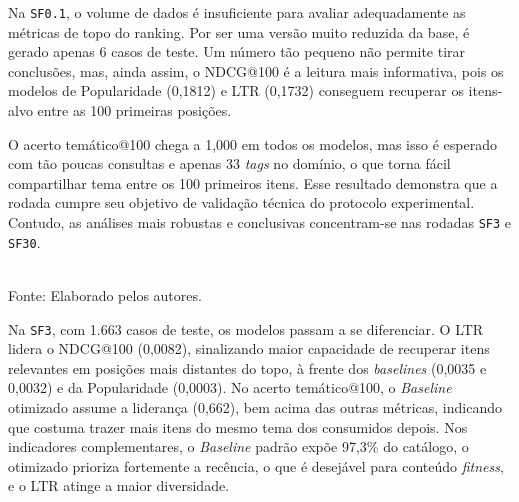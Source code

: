 \documentclass[a4paper,12pt]{article}
\begin{document}
{Na \texttt{SF0.1}, o volume de dados é insuficiente para avaliar adequadamente as métricas de topo do ranking. Por ser uma versão muito reduzida da base, é gerado apenas 6 casos de teste. Um número tão pequeno não permite tirar conclusões, mas, ainda assim, o NDCG@100 é a leitura mais informativa, pois os modelos de Popularidade (0,1812) e LTR (0,1732) conseguem recuperar os itens-alvo entre as 100 primeiras posições. 

O acerto temático@100 chega a 1,000 em todos os modelos, mas isso é esperado com tão poucas consultas e apenas 33 \textit{tags} no domínio, o que torna fácil compartilhar tema entre os 100 primeiros itens. Esse resultado demonstra que a rodada cumpre seu objetivo de validação técnica do protocolo experimental. Contudo, as análises mais robustas e conclusivas concentram-se nas rodadas \texttt{SF3} e \texttt{SF30}.

\begin{table}[H]
\centering
\caption{Resultados da rodada intermediária na versão \texttt{SF3}}
\label{tab:resultados_sf3}
\scriptsize
{}
\small \\ Fonte: Elaborado pelos autores.
\end{table}

Na \texttt{SF3}, com 1.663 casos de teste, os modelos passam a se diferenciar. O LTR lidera o NDCG@100 (0,0082), sinalizando maior capacidade de recuperar itens relevantes em posições mais distantes do topo, à frente dos \textit{baselines} (0,0035 e 0,0032) e da Popularidade (0,0003). No acerto temático@100, o \textit{Baseline} otimizado assume a liderança (0,662), bem acima das outras métricas, indicando que costuma trazer mais itens do mesmo tema dos consumidos depois. Nos indicadores complementares, o \textit{Baseline} padrão expõe 97,3\% do catálogo, o otimizado prioriza fortemente a recência, o que é desejável para conteúdo \textit{fitness}, e o LTR atinge a maior diversidade.

}
\end{document}

